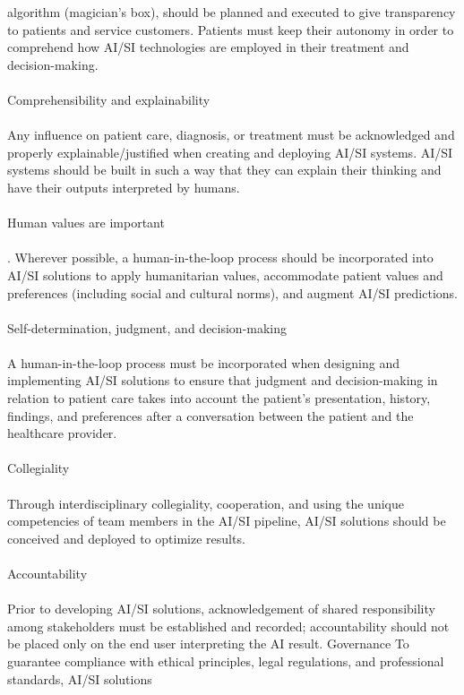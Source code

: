 \documentclass[12pt]{article}
\begin{document}
algorithm (magician's box), should be planned and executed to give transparency to patients and service
customers. Patients must keep their autonomy in order to comprehend how AI/SI technologies are employed in
their treatment and decision-making. \\\\Comprehensibility and explainability\\\\
Any influence on patient care, diagnosis, or treatment must be acknowledged and properly explainable/justified
when creating and deploying AI/SI systems. AI/SI systems should be built in such a way that they can explain
their thinking and have their outputs interpreted by humans.\\\\ Human values are important\\\\. Wherever possible, a human-in-the-loop process should be incorporated into AI/SI solutions to apply
humanitarian values, accommodate patient values and preferences (including social and cultural norms), and
augment AI/SI predictions. \\\\Self-determination, judgment, and decision-making\\\\
A human-in-the-loop process must be incorporated when designing and implementing AI/SI solutions to ensure
that judgment and decision-making in relation to patient care takes into account the patient's presentation, history, findings, and preferences after a conversation between the patient and the healthcare provider. \\\\Collegiality\\\\
Through interdisciplinary collegiality, cooperation, and using the unique competencies of team members in the
AI/SI pipeline, AI/SI solutions should be conceived and deployed to optimize results. \\\\Accountability\\\\
Prior to developing AI/SI solutions, acknowledgement of shared responsibility among stakeholders must be
established and recorded; accountability should not be placed only on the end user interpreting the AI result. Governance
To guarantee compliance with ethical principles, legal regulations, and professional standards, AI/SI solutions
\end{document}
